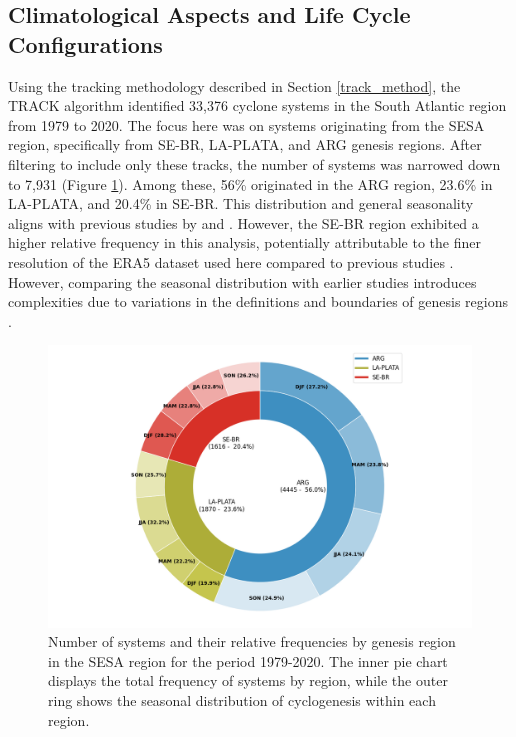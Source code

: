 \subsection{Climatological Aspects and Life Cycle Configurations}
\label{sec:climatological_aspects}

Using the tracking methodology described in Section \ref{track_method}, the TRACK algorithm identified 33,376 cyclone systems in the South Atlantic region from 1979 to 2020. The focus here was on systems originating from the SESA region, specifically from SE-BR, LA-PLATA, and ARG genesis regions. After filtering to include only these tracks, the number of systems was narrowed down to 7,931 (Figure \ref{fig:pie_climatology}). Among these, 56\% originated in the ARG region, 23.6\% in LA-PLATA, and 20.4\% in SE-BR. This distribution and general seasonality aligns with previous studies by \citet{gramcianinov2019properties} and \citet{crespo2021potential}. However, the SE-BR region exhibited a higher relative frequency in this analysis, potentially attributable to the finer resolution of the ERA5 dataset used here compared to previous studies \citep{gramcianinov2020analysis}. However, comparing the seasonal distribution with earlier studies introduces complexities due to variations in the definitions and boundaries of genesis regions \citep[e.g.,]{reboita2010regimes, crespo2021potential}.

\begin{figure}[ht]
    \centering
    \includegraphics[width=\textwidth]{figs_4/pie_systems_count.png}
    \caption[Cyclogenesis Climatology in the SESA Region]{Number of systems and their relative frequencies by genesis region in the SESA region for the period 1979-2020. The inner pie chart displays the total frequency of systems by region, while the outer ring shows the seasonal distribution of cyclogenesis within each region.}
\label{fig:pie_climatology}
\end{figure}



